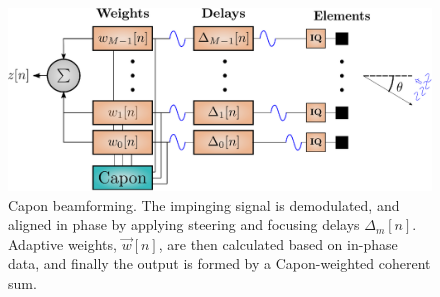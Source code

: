 
\begin{figure}
\centerline{\includegraphics[width=.7\linewidth]{gfx/beamforming_mv.eps}}
\caption{Capon beamforming. The impinging signal is demodulated, and aligned in phase by applying steering and focusing delays $\Delta_m[n]$. Adaptive weights, $\vec{w}[n]$, are then calculated based on in-phase data, and finally the output is formed by a Capon-weighted coherent sum.}
\label{II_fig:mvbf}
\end{figure}

